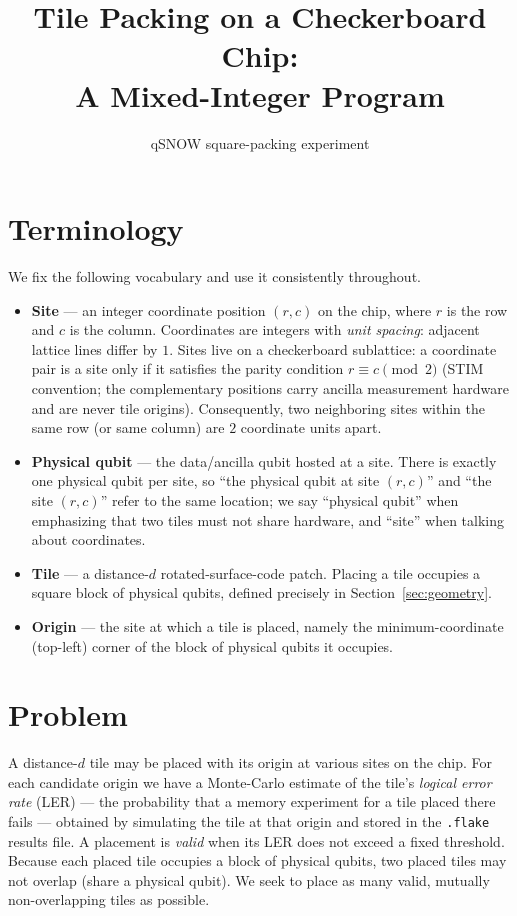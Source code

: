 \documentclass[11pt]{article}
\title{Tile Packing on a Checkerboard Chip:\\A Mixed-Integer Program}
\author{qSNOW square-packing experiment}
\date{}
\begin{document}
\maketitle

\section{Terminology}

We fix the following vocabulary and use it consistently throughout.
\begin{itemize}[itemsep=2pt]
  \item \textbf{Site} --- an integer coordinate position $(r, c)$ on the chip, where $r$ is
        the row and $c$ is the column. Coordinates are integers with \emph{unit spacing}:
        adjacent lattice lines differ by $1$. Sites live on a checkerboard sublattice: a
        coordinate pair is a site only if it satisfies the parity condition
        $r \equiv c \pmod 2$ (STIM convention; the complementary positions carry ancilla
        measurement hardware and are never tile origins). Consequently, two neighboring sites
        within the same row (or same column) are $2$ coordinate units apart.
  \item \textbf{Physical qubit} --- the data/ancilla qubit hosted at a site. There is exactly
        one physical qubit per site, so ``the physical qubit at site $(r,c)$'' and ``the site
        $(r,c)$'' refer to the same location; we say ``physical qubit'' when emphasizing that
        two tiles must not share hardware, and ``site'' when talking about coordinates.
  \item \textbf{Tile} --- a distance-$d$ rotated-surface-code patch. Placing a tile occupies
        a square block of physical qubits, defined precisely in Section~\ref{sec:geometry}.
  \item \textbf{Origin} --- the site at which a tile is placed, namely the minimum-coordinate
        (top-left) corner of the block of physical qubits it occupies.
\end{itemize}

\section{Problem}

A distance-$d$ tile may be placed with its origin at various sites on the chip. For each
candidate origin we have a Monte-Carlo estimate of the tile's \emph{logical error rate}
(LER) --- the probability that a memory experiment for a tile placed there fails --- obtained
by simulating the tile at that origin and stored in the \texttt{.flake} results file. A
placement is \emph{valid} when its LER does not exceed a fixed threshold. Because each placed
tile occupies a block of physical qubits, two placed tiles may not overlap (share a physical
qubit). We seek to place as many valid, mutually non-overlapping tiles as possible.
\end{document}
